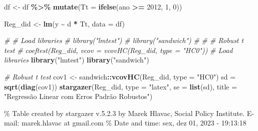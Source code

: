 \documentclass[
]{article}
\author{}
\date{\vspace{-2.5em}}
\newenvironment{Shaded}{\begin{snugshade}}{\end{snugshade}}
\newcommand{\AttributeTok}[1]{\textcolor[rgb]{0.13,0.29,0.53}{#1}}
\newcommand{\CommentTok}[1]{\textcolor[rgb]{0.56,0.35,0.01}{\textit{#1}}}
\newcommand{\DecValTok}[1]{\textcolor[rgb]{0.00,0.00,0.81}{#1}}
\newcommand{\FunctionTok}[1]{\textcolor[rgb]{0.13,0.29,0.53}{\textbf{#1}}}
\newcommand{\NormalTok}[1]{#1}
\newcommand{\OtherTok}[1]{\textcolor[rgb]{0.56,0.35,0.01}{#1}}
\newcommand{\SpecialCharTok}[1]{\textcolor[rgb]{0.81,0.36,0.00}{\textbf{#1}}}
\newcommand{\StringTok}[1]{\textcolor[rgb]{0.31,0.60,0.02}{#1}}
\begin{document}
\begin{Shaded}
\begin{Highlighting}[]
\NormalTok{df }\OtherTok{\textless{}{-}}\NormalTok{ df }\SpecialCharTok{\%\textgreater{}\%} \FunctionTok{mutate}\NormalTok{(}\AttributeTok{Tt =} \FunctionTok{ifelse}\NormalTok{(ano }\SpecialCharTok{\textgreater{}=} \DecValTok{2012}\NormalTok{, }\DecValTok{1}\NormalTok{, }\DecValTok{0}\NormalTok{))}
\end{Highlighting}
\end{Shaded}

\begin{Shaded}
\begin{Highlighting}[]
\NormalTok{Reg\_did }\OtherTok{\textless{}{-}} \FunctionTok{lm}\NormalTok{(y }\SpecialCharTok{\textasciitilde{}}\NormalTok{ d }\SpecialCharTok{*}\NormalTok{ Tt, }\AttributeTok{data =}\NormalTok{ df)}
\end{Highlighting}
\end{Shaded}

\begin{Shaded}
\begin{Highlighting}[]
\CommentTok{\# \# Load libraries}
\CommentTok{\# library("lmtest")}
\CommentTok{\# library("sandwich")}
\CommentTok{\# }
\CommentTok{\# \# Robust t test}
\CommentTok{\# coeftest(Reg\_did, vcov = vcovHC(Reg\_did, type = "HC0"))}
\CommentTok{\# Load libraries}
\FunctionTok{library}\NormalTok{(}\StringTok{"lmtest"}\NormalTok{)}
\FunctionTok{library}\NormalTok{(}\StringTok{"sandwich"}\NormalTok{)}

\CommentTok{\# Robust t test}
\NormalTok{cov1 }\OtherTok{\textless{}{-}}\NormalTok{ sandwich}\SpecialCharTok{::}\FunctionTok{vcovHC}\NormalTok{(Reg\_did, }\AttributeTok{type =} \StringTok{"HC0"}\NormalTok{)}
\NormalTok{sd }\OtherTok{=} \FunctionTok{sqrt}\NormalTok{(}\FunctionTok{diag}\NormalTok{(cov1))}
\FunctionTok{stargazer}\NormalTok{(Reg\_did, }\AttributeTok{type =} \StringTok{"latex"}\NormalTok{, }\AttributeTok{se =} \FunctionTok{list}\NormalTok{(sd),}
          \AttributeTok{title =} \StringTok{"Regressão Linear com Erros Padrão Robustos"}\NormalTok{)}
\end{Highlighting}
\end{Shaded}

\% Table created by stargazer v.5.2.3 by Marek Hlavac, Social Policy
Institute. E-mail: marek.hlavac at gmail.com \% Date and time: sex, dez
01, 2023 - 19:13:18
\end{document}
